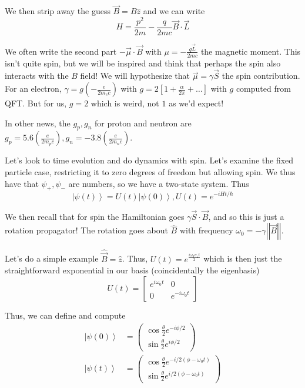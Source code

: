\documentclass[10pt]{report}
\newcommand{\ket}[1]{\left|#1\right>}
\newcommand{\norm}[1]{\left|\left|#1\right|\right|}
\begin{document}
We then strip away the guess $\vec{B} = B\hat{z}$ and we can write
$$H = \frac{p^2}{2m} - \frac{q}{2mc}\vec{B}\cdot \vec{L}$$

We often write the second part $-\vec{\mu}\cdot \vec{B}$ with $\mu = -\frac{q\vec{L}}{2mc}$ the magnetic moment. This isn't quite spin, but we will be inspired and think that perhaps the spin also interacts with the $B$ field! We will hypothesize that $\vec{\mu} = \gamma \vec{S}$ the spin contribution. For an electron, $\gamma = g\left( -\frac{e}{2m_ec} \right)$ with $g = 2\left[ 1 + \frac{\alpha}{2\pi} +\dots\right]$ with $g$ computed from QFT. But for us, $g=2$ which is weird, not $1$ as we'd expect! 

In other news, the $g_p, g_n$ for proton and neutron are $g_p = 5.6 \left( \frac{e}{2m_pc} \right), g_n = -3.8\left( \frac{e}{2m_nc} \right)$. 

Let's look to time evolution and do dynamics with spin. Let's examine the fixed particle case, restricting it to zero degrees of freedom but allowing spin. We thus have that $\psi_+, \psi_-$ are numbers, so we have a two-state system. Thus
$$\ket{\psi(t)}= U(t)\ket{\psi(0)}, U(t) = e^{-iHt/\hbar}$$

We then recall that for spin the Hamiltonian goes $\gamma \vec{S}\cdot \vec{B}$, and so this is just a rotation propagator! The rotation goes about $\hat{B}$ with frequency $\omega_0 = -\gamma\norm{\vec{B}}$.

Let's do a simple example $\hat{\vec{B}} = \hat{z}$. Thus, $U(t) = e^{\frac{i\omega_0 \sigma_z t}{2}}$ which is then just the straightforward exponential in our basis (coincidentally the eigenbasis)
$$U(t) = \begin{bmatrix}e^{i\omega_0 t}&0\\0&e^{-i\omega_0 t}\end{bmatrix}$$

Thus, we can define and compute
\begin{align*}
    \ket{\psi(0)} &= \begin{pmatrix} \cos \frac{\theta}{2} e^{-i\phi/2}\\\sin \frac{\theta}{2} e^{i\phi/2}\end{pmatrix}\\
    \ket{\psi(t)} &= \begin{pmatrix} \cos \frac{\theta}{2} e^{-i/2(\phi - \omega_0 t)}\\\sin \frac{\theta}{2} e^{i/2(\phi - \omega_0 t)}\end{pmatrix}\\
\end{align*}
\end{document}
